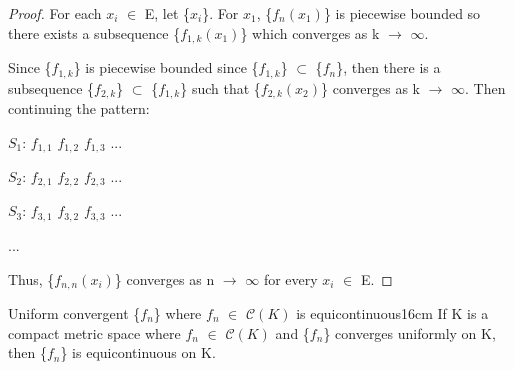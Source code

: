     \vspace{0.1cm}

    \begin{proof}
        For each $x_i$ $\in$ E, let \{$x_i$\}.
        For $x_1$, \{$f_n(x_1)$\} is piecewise bounded so there exists a
        subsequence \{$f_{1,k}(x_1)$\} which converges as k $\rightarrow$ $\infty$.
        
        Since \{$f_{1,k}$\} is piecewise bounded since \{$f_{1,k}$\}
        $\subset$ \{$f_n$\}, then there is a subsequence
        \{$f_{2,k}$\} $\subset$ \{$f_{1,k}$\} such that \{$f_{2,k}(x_2)$\}
        converges as k $\rightarrow$ $\infty$.
        Then continuing the pattern:

        \hspace{0.5cm}
        $S_1$:
        \hspace{1cm}
        $f_{1,1}$
        \hspace{1cm}
        $f_{1,2}$
        \hspace{1cm}
        $f_{1,3}$
        \hspace{1cm}
        ...

        \hspace{0.5cm}
        $S_2$:
        \hspace{1cm}
        $f_{2,1}$
        \hspace{1cm}
        $f_{2,2}$
        \hspace{1cm}
        $f_{2,3}$
        \hspace{1cm}
        ...

        \hspace{0.5cm}
        $S_3$:
        \hspace{1cm}
        $f_{3,1}$
        \hspace{1cm}
        $f_{3,2}$
        \hspace{1cm}
        $f_{3,3}$
        \hspace{1cm}
        ...

        \hspace{0.5cm}
        ...
    
        Thus, \{$f_{n,n}(x_i)$\} converges as n $\rightarrow$ $\infty$ for
        every $x_i$ $\in$ E.
    \end{proof}

    \newpage



    \begin{wtheorem}{Uniform convergent \{$f_n$\} where $f_n$ $\in$ $\mathscr{C}(K)$
    is equicontinuous}{16cm}
        If K is a compact metric space where $f_n$ $\in$ $\mathscr{C}(K)$ and
        \{$f_n$\} converges uniformly on K, then \{$f_n$\} is equicontinuous on K.
    \end{wtheorem}

